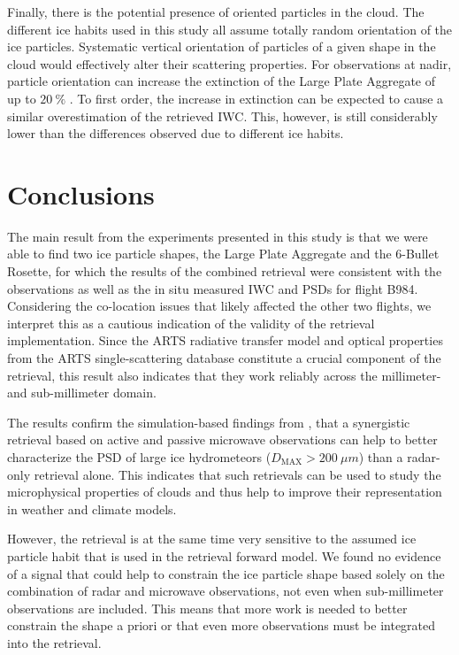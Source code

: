 \documentclass[journal abbreviation, manuscript]{copernicus}
\begin{document}
Finally, there is the potential presence of oriented particles in the cloud. The
different ice habits used in this study all assume totally random orientation of
the ice particles. Systematic vertical orientation of particles of a given shape
in the cloud would effectively alter their scattering properties. For
observations at nadir, particle orientation can increase the extinction of the
Large Plate Aggregate of up to $20\ \unit{\%}$ \citep{barlakas21}. To first
order, the increase in extinction can be expected to cause a similar
overestimation of the retrieved IWC. This, however, is still considerably lower
than the differences observed due to different ice habits.

\section{Conclusions}
\label{sec:conclusions}

The main result from the experiments presented in this study is that we were
able to find two ice particle shapes, the Large Plate Aggregate and the 6-Bullet
Rosette, for which the results of the combined retrieval were consistent with
the observations as well as the in situ measured IWC and PSDs for flight B984.
Considering the co-location issues that likely affected the other two flights,
we interpret this as a cautious indication of the validity of the retrieval
implementation. Since the ARTS radiative transfer model and optical properties
from the ARTS single-scattering database constitute a crucial component of the
retrieval, this result also indicates that they work reliably across the
millimeter- and sub-millimeter domain.

The results confirm the simulation-based findings from \citep{pfreundschuh20},
that a synergistic retrieval based on active and passive microwave observations
can help to better characterize the PSD of large ice hydrometeors ($D_\text{MAX}
> 200\ \unit{\mu m}$) than a radar-only retrieval alone. This indicates that
such retrievals can be used to study the microphysical properties of clouds and
thus help to improve their representation in weather and climate models.

However, the retrieval is at the same time very sensitive to the assumed ice
particle habit that is used in the retrieval forward model. We found no evidence
of a signal that could help to constrain the ice particle shape based solely on
the combination of radar and microwave observations, not even when
sub-millimeter observations are included. This means that more work is needed to
better constrain the shape a priori or that even more observations must be
integrated into the retrieval.
\end{document}
